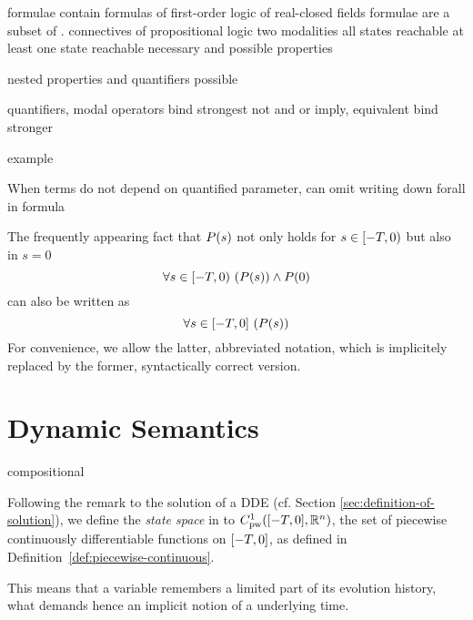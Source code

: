     \ddL formulae contain formulas of first-order logic of real-closed fields
    \FOLR formulae are a subset of \ddL.
    connectives of propositional logic
    two modalities
    all states reachable
    at least one state reachable
    necessary and possible properties

    nested properties and quantifiers possible

    \begin{convention}
        quantifiers, modal operators bind strongest
        not
        and
        or
        imply, equivalent
        bind stronger

        example
    \end{convention}

    When terms do not depend on quantified parameter, can omit writing down forall in formula

    \begin{convention}
        The frequently appearing fact that $P(s)$ not only holds for $s\in[-T,0)$ but also in $s=0$
        \begin{equation*}
            \forall s\in[-T,0){\,} \left(P(s)\right)\land P(0)
        \end{equation*}
        can also be written as
        \begin{equation*}
            \forall s\in[-T,0]{\,} \left(P(s)\right)
        \end{equation*}
        For convenience, we allow the latter, abbreviated notation, which is implicitely replaced by the former, syntactically correct version.
    \end{convention}

\section{Dynamic Semantics}
    \label{sec:dynamic-semantics}

    compositional

    Following the remark to the solution of a DDE (cf. Section \ref{sec:definition-of-solution}), we define the \emph{state space} in \ddL to $\statespace$, the set of piecewise continuously differentiable functions on $[-T,0]$, as defined in Definition~\ref{def:piecewise-continuous}.

    This means that a variable remembers a limited part of its evolution history, what demands hence an implicit notion of a underlying time.

